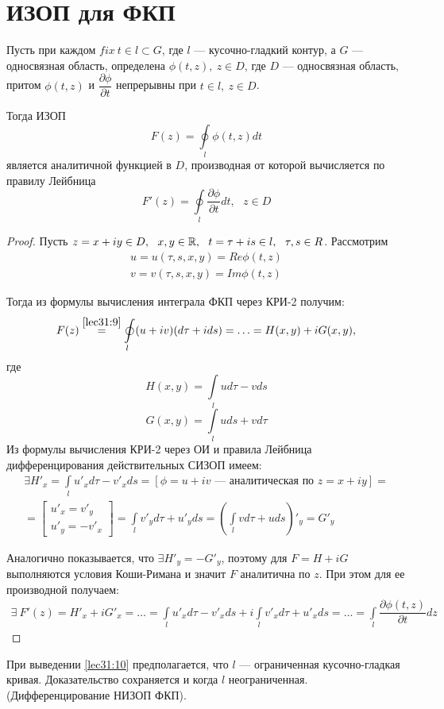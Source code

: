 \documentclass[../../main.tex]{subfiles}
\begin{document}
\section{ИЗОП для ФКП}
\begin{thm}
    Пусть при каждом $fix \ t \in l \subset G$, где $l$ --- кусочно-гладкий
    контур, а $G$ --- односвязная область, определена $ \phi(t, z), \
    z \in D $, где $D$ --- односвязная область, притом
    $\phi(t, z)$ и $\dfrac{\partial \phi}{\partial t}$ непрерывны при
    $t \in l, \ z \in D$.
    
    Тогда ИЗОП
    \begin{equation}
        \label{lec31:9}
        F(z) = \oint\limits_{l} \phi(t, z) dt
    \end{equation}
    является аналитичной функцией в $D$, производная от которой вычисляется
    по правилу Лейбница
    \begin{equation}
        \label{lec31:10}
        F'(z) = \oint\limits_{l} \dfrac{\partial \phi}{\partial t} dt,
        \ \ \ z \in D
    \end{equation}
\end{thm}
\begin{proof}
    Пусть $z = x + i y \in D, \ \ x, y \in \R, \ \ t = \tau + i s \in l,
    \ \ \tau, s \in R$. Рассмотрим \[ \begin{gathered}
    u = u(\tau, s, x, y) = Re \phi(t, z) \\
    v = v(\tau, s, x, y) = Im \phi(t, z)
    \end{gathered} \]

    Тогда из формулы вычисления интеграла ФКП через КРИ-2 получим:
    \[ F(z) \stackrel{\eqref{lec31:9}}{=} \oint\limits_{l} (u + i v)
    (d \tau + i d s) = \ldots = H(x, y) + i G(x, y),\]
    где
    \[ H(x, y) = \int\limits_{l} u d \tau - v d s \]
    \[ G(x, y) = \int\limits_{l} u d s + v d \tau \]
    Из формулы вычисления КРИ-2 через ОИ и правила Лейбница
    дифференцирования действительных СИЗОП имеем:
    \[ \begin{gathered} 
        \exists H'_x = \int\limits_{l} u'_x d \tau - v'_x d s =
        [ \phi = u + i v \text{ \ --- аналитическая по \ } z = x + i y ]
        = \\ =
        \left[\begin{gathered}
            u'_x = v'_y \\
            u'_y = - v'_x
        \end{gathered}\right] =
        \int\limits_{l} v'_y d \tau + u'_y d s =
        \left(\int\limits_{l} v d \tau + u d s\right)'_y = G'_y
    \end{gathered} \]

    Аналогично показывается, что $\exists H'_y = -G'_y$, поэтому для
    $ F = H + i G $
    выполняются условия Коши-Римана и значит $F$ аналитична по $z$.
    При этом для ее производной получаем:
    \[\begin{gathered}
        \exists \ F'(z) = H'_x + i G'_x = \ldots =
        \int\limits_{l} u'_x d \tau - v'_x d s + 
        i \int\limits_{l} v'_x d \tau + u'_x d s = \ldots =
        \int\limits_{l} \dfrac{\partial \phi (t, z)}{\partial t} d z
    \end{gathered}\] 
\end{proof}
\begin{rem}
    При выведении \eqref{lec31:10} предполагается, что $l$ ---
    ограниченная кусочно-гладкая кривая. Доказательство сохраняется
    и когда $l$ неограниченная. (Дифференцирование НИЗОП ФКП).
\end{rem}
\end{document}
